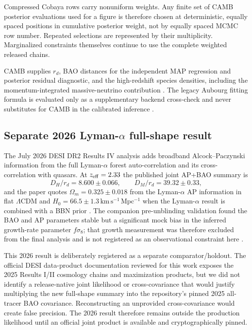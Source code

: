 Compressed Cobaya rows carry nonuniform weights. Any finite set of CAMB posterior evaluations used for a figure is therefore chosen at deterministic, equally spaced positions in cumulative posterior weight, not by equally spaced MCMC row number. Repeated selections are represented by their multiplicity. Marginalized constraints themselves continue to use the complete weighted released chains.

CAMB supplies $r_d$, BAO distances for the independent MAP regression and posterior residual diagnostic, and the high-redshift species densities, including the momentum-integrated massive-neutrino contribution \cite{camb2000,camb2026}. The legacy Aubourg fitting formula is evaluated only as a supplementary backend cross-check and never substitutes for CAMB in the calibrated inference \cite{aubourg2015}.

\subsection{Separate 2026 Lyman-$\alpha$ full-shape result}
The July 2026 DESI DR2 Results IV analysis adds broadband Alcock--Paczynski information from the full Lyman-$\alpha$ forest auto-correlation and its cross-correlation with quasars. At $z_{\rm eff}=2.33$ the published joint AP+BAO summary is
\begin{equation}
D_H/r_d=8.600\pm0.066,\qquad D_M/r_d=39.32\pm0.33,
\end{equation}
and the paper quotes $\Omega_m=0.325\pm0.018$ from the Lyman-$\alpha$ AP information in flat $\Lambda$CDM and $H_0=66.5\pm1.3\,\mathrm{km\,s^{-1}\,Mpc^{-1}}$ when the Lyman-$\alpha$ result is combined with a BBN prior \cite{desi2026iv}. The companion pre-unblinding validation found the BAO and AP parameters stable but a significant mock bias in the inferred growth-rate parameter $f\sigma_8$; that growth measurement was therefore excluded from the final analysis and is not registered as an observational constraint here \cite{desi2026lyavalidation}.

This 2026 result is deliberately registered as a separate comparator/holdout. The official DESI data-product documentation reviewed for this work exposes the 2025 Results I/II cosmology chains and maximization products, but we did not identify a release-native joint likelihood or cross-covariance that would justify multiplying the new full-shape summary into the repository's pinned 2025 all-tracer BAO covariance. Reconstructing an unprovided cross-covariance would create false precision. The 2026 result therefore remains outside the production likelihood until an official joint product is available and cryptographically pinned.

